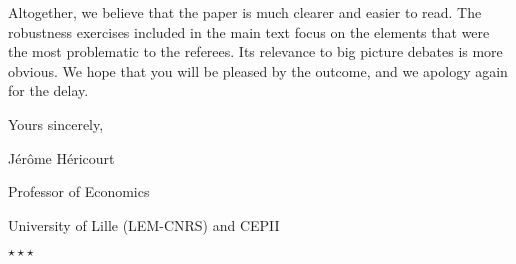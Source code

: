\documentclass[12pt]{article}
\newcommand*\sepstars{%
  \begin{center}
    $\star\star\star$
  \end{center}}
\begin{document}
Altogether, we believe that the paper is much clearer and easier to read. The robustness exercises included in the main text focus on the elements that were the most problematic to the referees. Its relevance to big picture debates is more obvious. We hope that you will be pleased by the outcome, and we apology again for the delay.

\bigskip

Yours sincerely,

\bigskip

\hfill Jérôme Héricourt

\hfill Professor of Economics

\hfill University of Lille (LEM-CNRS) and CEPII

\bigskip
\bigskip
\bigskip
\sepstars
\end{document}
